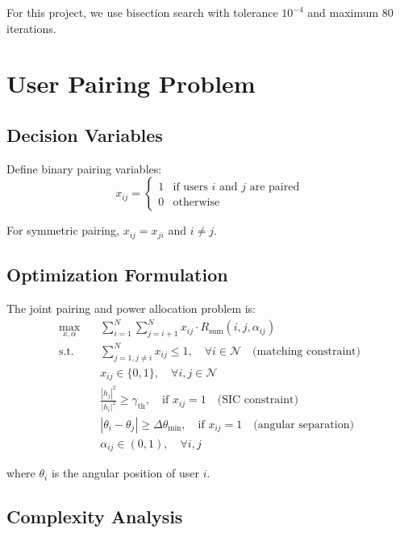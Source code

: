 For this project, we use bisection search with tolerance $10^{-4}$ and maximum 80 iterations.

\section{User Pairing Problem}

\subsection{Decision Variables}

Define binary pairing variables:
\begin{equation}
x_{ij} = \begin{cases}
1 & \text{if users } i \text{ and } j \text{ are paired} \\
0 & \text{otherwise}
\end{cases}
\end{equation}

For symmetric pairing, $x_{ij} = x_{ji}$ and $i \neq j$.

\subsection{Optimization Formulation}

The joint pairing and power allocation problem is:
\begin{equation}
\begin{aligned}
\max_{x, \alpha} \quad & \sum_{i=1}^{N} \sum_{j=i+1}^{N} x_{ij} \cdot R_{\text{sum}}(i, j, \alpha_{ij}) \\
\text{s.t.} \quad & \sum_{j=1, j \neq i}^{N} x_{ij} \leq 1, \quad \forall i \in \mathcal{N} \quad \text{(matching constraint)} \\
& x_{ij} \in \{0, 1\}, \quad \forall i, j \in \mathcal{N} \\
& \frac{|h_j|^2}{|h_i|^2} \geq \gamma_{\text{th}}, \quad \text{if } x_{ij} = 1 \quad \text{(SIC constraint)} \\
& |\theta_i - \theta_j| \geq \Delta\theta_{\min}, \quad \text{if } x_{ij} = 1 \quad \text{(angular separation)} \\
& \alpha_{ij} \in (0, 1), \quad \forall i, j
\end{aligned}
\label{eq:main_problem}
\end{equation}

where $\theta_i$ is the angular position of user $i$.

\subsection{Complexity Analysis}

